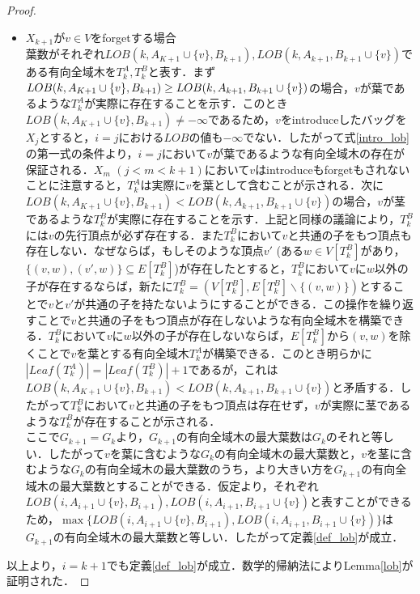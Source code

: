 \documentclass[master]{kuisthesis}		%
\theoremstyle{plain}
\theoremstyle{definition}
\begin{document}
\begin{proof}
\begin{itemize}
        \item $X_{k+1}$が$v \in V$をforgetする場合 \\
        葉数がそれぞれ$LOB(k, A_{K+1} \cup \{v\}, B_{k+1}), LOB(k, A_{k+1}, B_{k+1} \cup \{v\})$である有向全域木を$T^A_k, T^B_k$と表す．まず$LOB(k, A_{K+1} \cup \{v\}, B_{k+1}) \geq \\LOB(k, A_{k+1}, B_{k+1} \cup \{v\})$の場合，$v$が葉であるような$T^A_k$が実際に存在することを示す．このとき$LOB(k, A_{K+1} \cup \{v\}, B_{k+1}) \neq -\infty$であるため，$v$をintroduceしたバッグを$X_j$とすると，$i=j$における$LOB$の値も$-\infty$でない．したがって式\ref{intro_lob}の第一式の条件より，$i=j$において$v$が葉であるような有向全域木の存在が保証される．$X_m$ $(j < m < k+1)$において$v$はintroduceもforgetもされないことに注意すると，$T^A_k$は実際に$v$を葉として含むことが示される．次に$LOB(k, A_{K+1} \cup \{v\}, B_{k+1}) < LOB(k, A_{k+1}, B_{k+1} \cup \{v\})$の場合，$v$が茎であるような$T^B_k$が実際に存在することを示す．上記と同様の議論により，$T^B_k$には$v$の先行頂点が必ず存在する．また$T^B_k$において$v$と共通の子をもつ頂点も存在しない．なぜならば，もしそのような頂点$v'$ (ある$w \in V[T^B_k]$があり，$\{(v, w), (v', w)\} \subseteq E[T^B_k]$)が存在したとすると，$T^B_k$において$v$に$w$以外の子が存在するならば，新たに$T^B_k = (V[T^B_k], E[T^B_k] \backslash \{(v, w)\})$とすることで$v$と$v'$が共通の子を持たないようにすることができる．この操作を繰り返すことで$v$と共通の子をもつ頂点が存在しないような有向全域木を構築できる．$T^B_k$において$v$に$w$以外の子が存在しないならば，$E[T^B_k]$から$(v, w)$を除くことで$v$を葉とする有向全域木$T^A_k$が構築できる．このとき明らかに$|Leaf(T^A_k)| = |Leaf(T^B_k)| + 1$であるが，これは$LOB(k, A_{K+1} \cup \{v\}, B_{k+1}) < LOB(k, A_{k+1}, B_{k+1} \cup \{v\})$と矛盾する．したがって$T^B_k$において$v$と共通の子をもつ頂点は存在せず，$v$が実際に茎であるような$T^B_k$が存在することが示される．\\
        ここで$G_{k+1} = G_k$より，$G_{k+1}$の有向全域木の最大葉数は$G_k$のそれと等しい．したがって$v$を葉に含むような$G_k$の有向全域木の最大葉数と，$v$を茎に含むような$G_k$の有向全域木の最大葉数のうち，より大きい方を$G_{k+1}$の有向全域木の最大葉数とすることができる．仮定より，それぞれ$LOB(i, A_{i+1} \cup \{v\}, B_{i+1}), LOB(i, A_{i+1}, B_{i+1} \cup \{v\})$と表すことができるため，$\max \{LOB(i, A_{i+1} \cup \{v\}, B_{i+1}), LOB(i, A_{i+1}, B_{i+1} \cup \{v\})\}$は$G_{k+1}$の有向全域木の最大葉数と等しい．したがって定義\ref{def_lob}が成立．
    \end{itemize}
    以上より，$i = k+1$でも定義\ref{def_lob}が成立．数学的帰納法によりLemma\ref{lob}が証明された．
\end{proof}
\end{document}
